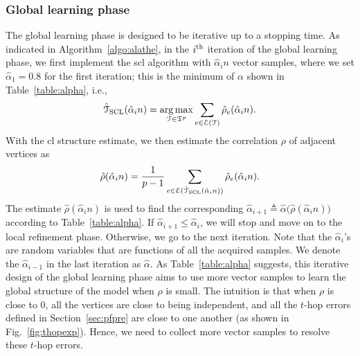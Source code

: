 \documentclass[11pt,onecolumn]{article}
\newcommand{\calE}{\mathcal{E}}
\newcommand{\calT}{\mathcal{T}}
\newcommand{\hatcalT}{\hat{\calT}}
\newcommand{\frakT}{\mathfrak{T}}
\newcommand{\halpha}{\hat{\alpha}}
\newcommand{\hrho}{\hat{\rho}}
\DeclareMathOperator*{\argmax}{arg\,max}
\begin{document}
\subsubsection{Global learning phase}
The global learning phase is designed to be iterative up to a stopping time. As indicated in Algorithm~\ref{algo:alathe}, in the $i^{{\rm th}}$ iteration of the global learning phase, we first implement the \ac{scl} algorithm 
with $\halpha_{i}n$ vector samples, where we set $\halpha_{1}=0.8$ for the first iteration; this is the minimum   of $\alpha$ shown in Table~\ref{table:alpha}, i.e., 
\begin{align}\label{eq:clvariant}
	\hatcalT_{\rm{SCL}}(\halpha_{i}n)=\argmax_{\calT\in\frakT^{p}} \sum_{e\in\calE(\calT)} \hrho_{e}(\halpha_{i}n).
\end{align}
With the \ac{cl} structure estimate, we then estimate the correlation $\rho$ of adjacent vertices as
\begin{align}\label{eq:rhohat}
	\hrho(\halpha_{i}n)=\frac{1}{p-1}\sum_{e\in\calE(\hatcalT_{\rm{SCL}}(\halpha_{i}n) )}\hrho_{e}(\halpha_{i}n) .
\end{align}
The estimate $\hrho(\halpha_{i}n)$ is used to find the corresponding $\halpha_{i+1} \triangleq \halpha\big(\hrho(\halpha_{i}n)\big)$ according to Table~\ref{table:alpha}. If $\halpha_{i+1}\leq \halpha_{i}$, we will stop and move on to the local refinement phase. Otherwise, we go to the next 
iteration. Note that   the $\halpha_{i}$'s are  random variables that are  functions of all the acquired samples. We denote the $\halpha_{i-1}$ in the last iteration as $\halpha$. As Table~\ref{table:alpha} suggests, this iterative design of the global learning phase aims to use more vector samples to learn the global structure of the model when $\rho$ is small. 
The intuition is that when $\rho$ is close to 0, all the vertices are close to being independent, and all the $t$-hop errors defined in Section~\ref{sec:pfpre} are close to one another (as shown in Fig.~\ref{fig:thopexp}). Hence, we need to collect more vector samples to resolve these $t$-hop errors.
\end{document}
